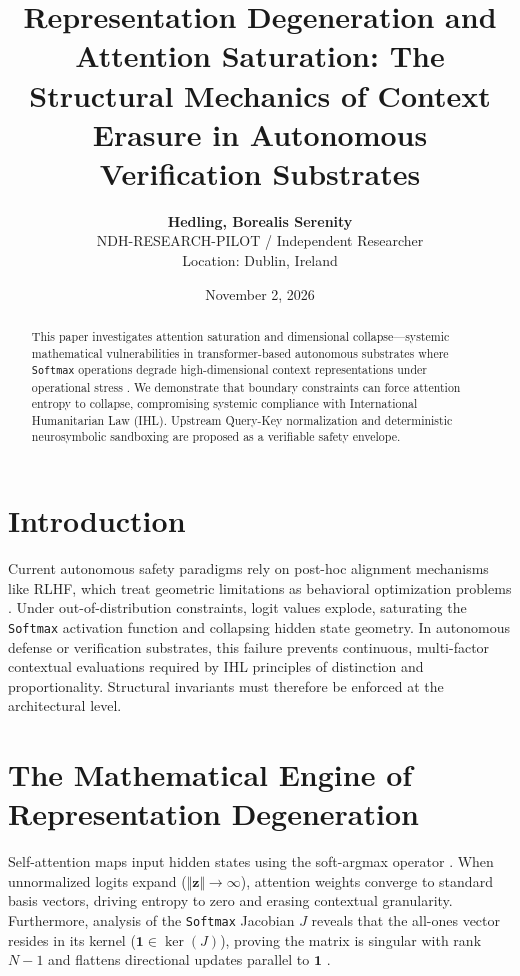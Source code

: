 \documentclass[11pt,twocolumn]{article}
\title{\textbf{Representation Degeneration and Attention Saturation: The Structural Mechanics of Context Erasure in Autonomous Verification Substrates}}
\author{\textbf{Hedling, Borealis Serenity} \\ 
\small NDH-RESEARCH-PILOT / Independent Researcher \\
\small Location: Dublin, Ireland}
\date{November 2, 2026}
\begin{document}
\maketitle

\begin{abstract}
This paper investigates attention saturation and dimensional collapse—systemic mathematical vulnerabilities in transformer-based autonomous substrates where \texttt{Softmax} operations degrade high-dimensional context representations under operational stress \citep{vaswani2017attention, dong2021attention}. We demonstrate that boundary constraints can force attention entropy to collapse, compromising systemic compliance with International Humanitarian Law (IHL). Upstream Query-Key normalization and deterministic neurosymbolic sandboxing are proposed as a verifiable safety envelope.
\end{abstract}

\section{Introduction}
Current autonomous safety paradigms rely on post-hoc alignment mechanisms like RLHF, which treat geometric limitations as behavioral optimization problems \citep{sutton2018reinforcement}. Under out-of-distribution constraints, logit values explode, saturating the \texttt{Softmax} activation function and collapsing hidden state geometry. In autonomous defense or verification substrates, this failure prevents continuous, multi-factor contextual evaluations required by IHL principles of distinction and proportionality. Structural invariants must therefore be enforced at the architectural level.

\section{The Mathematical Engine of Representation Degeneration}
Self-attention maps input hidden states using the soft-argmax operator \citep{vaswani2017attention}. When unnormalized logits expand ($\Vert{}\mathbf{z}\Vert{} \to \infty$), attention weights converge to standard basis vectors, driving entropy to zero and erasing contextual granularity. Furthermore, analysis of the \texttt{Softmax} Jacobian $J$ reveals that the all-ones vector resides in its kernel ($\mathbf{1} \in \ker(J)$), proving the matrix is singular with rank $N-1$ and flattens directional updates parallel to $\mathbf{1}$ \citep{dong2021attention}.
\end{document}
